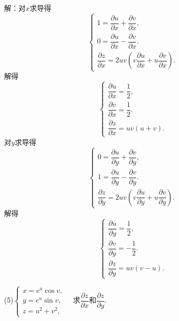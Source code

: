 \documentclass[12pt, a4paper]{article}
\begin{document}
解：对\(x\)求导得
\[\begin{cases}
1 = \dfrac{\partial u}{\partial x} + \dfrac{\partial v}{\partial x}, \\
0 = \dfrac{\partial u}{\partial x} - \dfrac{\partial v}{\partial x}. \\
\dfrac{\partial z}{\partial x} = 2uv(v \dfrac{\partial u}{\partial x} + u \dfrac{\partial v}{\partial x}).
\end{cases}\]
解得
\[\begin{cases}
\dfrac{\partial u}{\partial x} = \dfrac{1}{2}, \\
\dfrac{\partial v}{\partial x} = \dfrac{1}{2}. \\
\dfrac{\partial z}{\partial x} = uv(u + v).
\end{cases}\]
对\(y\)求导得
\[\begin{cases}
0 = \dfrac{\partial u}{\partial y} + \dfrac{\partial v}{\partial y}, \\
1 = \dfrac{\partial u}{\partial y} - \dfrac{\partial v}{\partial y}. \\
\dfrac{\partial z}{\partial y} = 2uv(v \dfrac{\partial u}{\partial y} + u \dfrac{\partial v}{\partial y}).

\end{cases}\]
解得
\[\begin{cases}
\dfrac{\partial u}{\partial y} = \dfrac{1}{2}, \\
\dfrac{\partial v}{\partial y} = -\dfrac{1}{2}. \\
\dfrac{\partial z}{\partial y} = uv(v - u).
\end{cases}\]

(5)\(\begin{cases}
x = e^u \cos v, \\
y = e^u \sin v, \\
z = u^2 + v^2,
\end{cases} \quad\)求\(\dfrac{\partial z}{\partial x}\)和\(\dfrac{\partial z}{\partial y}\).
\end{document}
